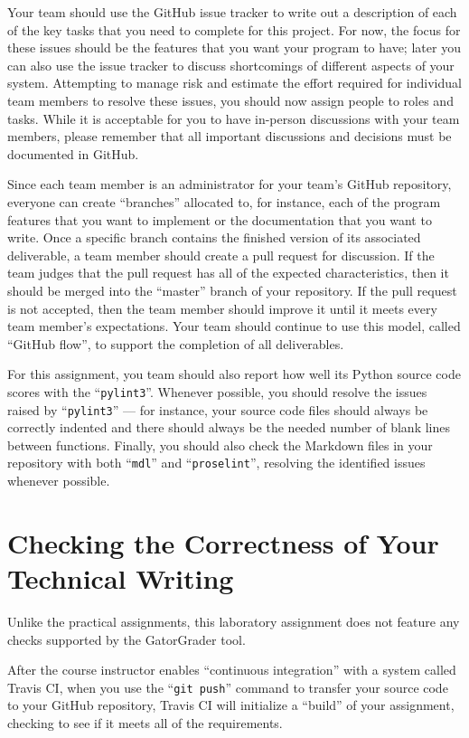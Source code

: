 \documentclass[11pt]{article}
\newcommand{\gitpush}{\command{git push}}
\newcommand{\command}[1]{``\lstinline{#1}''}
\newcommand{\step}[1]{``{#1}''}
\begin{document}
Your team should use the GitHub issue tracker to write out a description of each
of the key tasks that you need to complete for this project. For now, the focus
for these issues should be the features that you want your program to have;
later you can also use the issue tracker to discuss shortcomings of different
aspects of your system. Attempting to manage risk and estimate the effort
required for individual team members to resolve these issues, you should now
assign people to roles and tasks. While it is acceptable for you to have
in-person discussions with your team members, please remember that all important
discussions and decisions must be documented in GitHub.

Since each team member is an administrator for your team's GitHub repository,
everyone can create ``branches'' allocated to, for instance, each of the program
features that you want to implement or the documentation that you want to write.
Once a specific branch contains the finished version of its associated
deliverable, a team member should create a pull request for discussion. If the
team judges that the pull request has all of the expected characteristics, then
it should be merged into the ``master'' branch of your repository. If the pull
request is not accepted, then the team member should improve it until it meets
every team member's expectations. Your team should continue to use this model,
called ``GitHub flow'', to support the completion of all deliverables.

For this assignment, you team should also report how well its Python source code
scores with the \command{pylint3}. Whenever possible, you should resolve the
issues raised by \command{pylint3} --- for instance, your source code files
should always be correctly indented and there should always be the needed number
of blank lines between functions. Finally, you should also check the Markdown
files in your repository with both \command{mdl} and \command{proselint},
resolving the identified issues whenever possible.

\section*{Checking the Correctness of Your Technical Writing}

Unlike the practical assignments, this laboratory assignment does not feature
any checks supported by the GatorGrader tool.

After the course instructor enables \step{continuous integration} with a system
called Travis CI, when you use the \gitpush{} command to transfer your source
code to your GitHub repository, Travis CI will initialize a \step{build} of your
assignment, checking to see if it meets all of the requirements.
\end{document}
